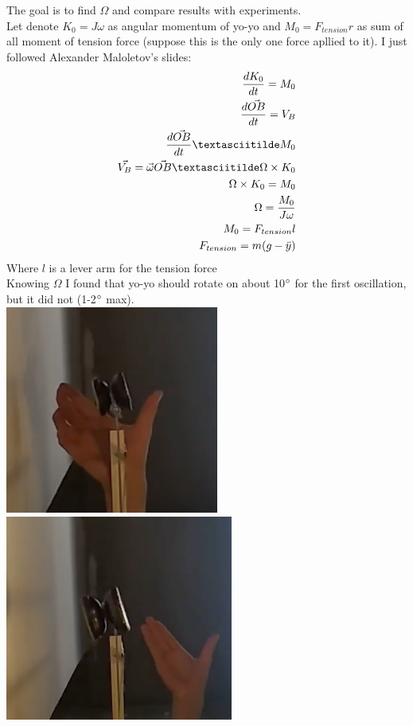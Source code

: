 \documentclass[a4paper,11pt,oneside,article]{memoir}
\begin{document}
The goal is to find $\Omega$ and compare results with experiments. \\
Let denote $K_0 = J\omega$ as angular momentum of yo-yo and $M_0 = F_{tension} r$ as sum of all moment of tension force (suppose this is the only one force apllied to it). I just followed Alexander Maloletov's slides:\\
\begin{equation}
    \begin{split}
        \frac{dK_0}{dt} = M_0\\
        \frac{d \Vec{OB}}{dt} = V_B\\
        \frac{d \Vec{OB}}{dt} \textasciitilde M_0\\
        \Vec{V_B} = \Vec{\omega} \Vec{OB} \textasciitilde \Omega \times K_0\\
        \Omega \times K_0 = M_0\\
        \Omega = \frac{M_0}{J\omega}\\
        M_0 = F_{tension} l\\
        F_{tension} = m(g-\ddot y)
    \end{split}
\end{equation}
 Where $l$ is a lever arm for the tension force \\

Knowing $\Omega$ I found that yo-yo should rotate on about 10$\degree$ for the first oscillation, but it did not (1-2$\degree$ max).\\
\includegraphics[width=7cm]{images/pic14.png}
\includegraphics[width=7.5cm]{images/pic15.png}\\
\end{document}
